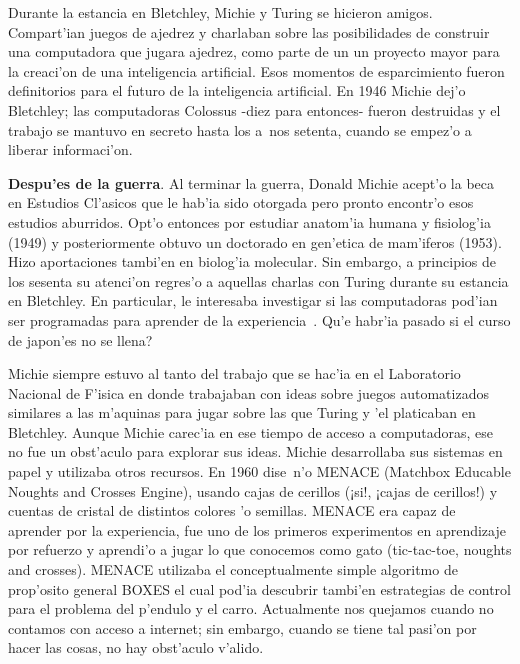 \documentclass[11pt]{article}
\begin{document}
\medskip
Durante la estancia en Bletchley, Michie y Turing se hicieron amigos. Compart'ian juegos de ajedrez y charlaban sobre las posibilidades de construir una computadora que jugara ajedrez, como parte de un un proyecto mayor para la creaci'on de una inteligencia artificial. Esos momentos de esparcimiento fueron definitorios para el futuro de la inteligencia artificial. En 1946 Michie dej'o Bletchley; las computadoras Colossus -diez para entonces- fueron destruidas y el trabajo se mantuvo en secreto hasta los a~nos setenta, cuando se empez'o a liberar informaci'on.

\medskip
\textbf{Despu'es de la guerra}. Al terminar la guerra, Donald Michie acept'o la beca en Estudios Cl'asicos que le hab'ia sido otorgada pero pronto encontr'o esos estudios aburridos. Opt'o  entonces por estudiar anatom'ia humana y fisiolog'ia (1949) y posteriormente obtuvo un doctorado en gen'etica de mam'iferos (1953). Hizo aportaciones tambi'en en biolog'ia molecular. Sin embargo, a principios de los sesenta su atenci'on regres'o a aquellas charlas con Turing durante su estancia en Bletchley. En particular, le interesaba investigar si las computadoras pod'ian ser programadas para aprender de la experiencia~\cite{colossusJack}. \textquestiondown Qu'e habr'ia pasado si el curso de japon'es no se llena?

Michie siempre estuvo al tanto del trabajo que se hac'ia en el Laboratorio Nacional de F'isica en donde trabajaban con ideas sobre juegos automatizados similares a las m'aquinas para jugar sobre las que Turing y 'el platicaban en Bletchley. Aunque Michie carec'ia en ese tiempo de acceso a computadoras, ese no fue un obst'aculo para explorar sus ideas. Michie desarrollaba sus sistemas en papel y utilizaba otros recursos. En 1960 dise~n'o MENACE (Matchbox Educable Noughts and Crosses Engine), usando cajas de cerillos (¡si!, ¡cajas de cerillos!) y cuentas de cristal de distintos colores 'o semillas. MENACE era capaz de aprender por la experiencia, fue uno de los primeros experimentos en aprendizaje por refuerzo y aprendi'o a jugar lo que conocemos como gato (tic-tac-toe, noughts and crosses). MENACE utilizaba el conceptualmente simple algoritmo de prop'osito general BOXES el cual pod'ia descubrir tambi'en estrategias de control para el problema del p'endulo y el carro. Actualmente nos quejamos cuando no contamos con acceso a internet; sin embargo, cuando se tiene tal pasi'on por hacer las cosas, no hay obst'aculo v'alido.
\end{document}
